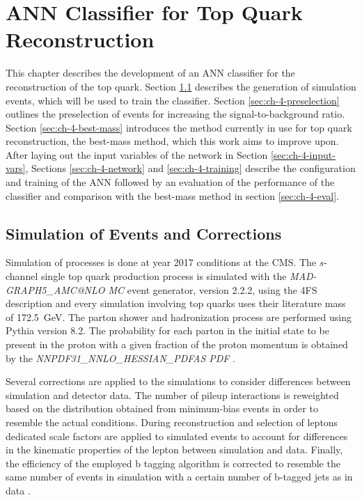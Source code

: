 \chapter{ANN Classifier for Top Quark Reconstruction}
\label{ch:classifier}

This chapter describes the development of an ANN classifier for the reconstruction of the top quark.
Section \ref{sec:ch-4-simulation} describes the generation of simulation events, which will be used to train the classifier. Section \ref{sec:ch-4-preselection} outlines the preselection of events for increasing the signal-to-background ratio. Section \ref{sec:ch-4-best-mass} introduces the method currently in use for top quark reconstruction, the best-mass method, which this work aims to improve upon. After laying out the input variables of the network in Section \ref{sec:ch-4-input-vars}, Sections \ref{sec:ch-4-network} and \ref{sec:ch-4-training} describe the configuration and training of the ANN followed by an evaluation of the performance of the classifier and comparison with the best-mass method in section \ref{sec:ch-4-eval}.

\section{Simulation of Events and Corrections}
\label{sec:ch-4-simulation}
Simulation of processes is done at year 2017 conditions at the CMS. The $s$-channel single top quark production process is simulated with the \emph{MAD-GRAPH5\_AMC@NLO MC} event generator, version 2.2.2, using the 4FS description \cite{Fal18} and every simulation involving top quarks uses their literature mass of \SI{172.5}{GeV}. The parton shower and hadronization process are performed using Pythia version 8.2. The probability for each parton in the initial state to be present in the proton with a given fraction of the proton momentum is obtained by the \emph{NNPDF31\_NNLO\_HESSIAN\_PDFAS PDF} \cite{Fal18}.

Several corrections are applied to the simulations to consider differences between simulation and detector data. The number of pileup interactions is reweighted based on the distribution obtained from minimum-bias events in order to resemble the actual conditions. During reconstruction and selection of leptons dedicated scale factors are applied to simulated events to account for differences in the kinematic properties of the lepton between simulation and data. Finally, the efficiency of the employed b tagging algorithm is corrected to resemble the same number of events in simulation with a certain number of b-tagged jets as in data \cite{Fal18}.

